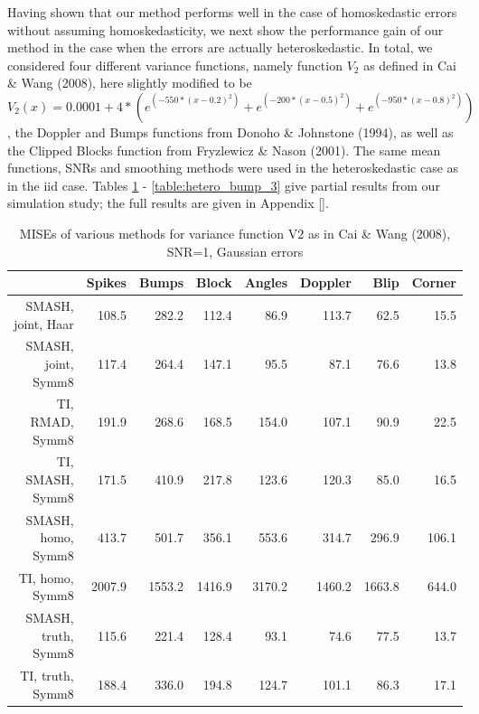 \documentclass[12pt]{article}
\begin{document}
Having shown that our method performs well in the case of homoskedastic errors without assuming homoskedasticity, we next show the performance gain of our method in the case when the errors are actually heteroskedastic. In total, we considered four different variance functions, namely function $V_2$ as defined in Cai \& Wang (2008), here slightly modified to be
\[V_2(x)=0.0001+4*(e^{(-550*(x-0.2)^2)}+e^{(-200*(x-0.5)^2)}+e^{(-950*(x-0.8)^2)})\]
, the Doppler and Bumps functions from Donoho \& Johnstone (1994), as well as the Clipped Blocks function from Fryzlewicz \& Nason (2001). The same mean functions, SNRs and smoothing methods were used in the heteroskedastic case as in the iid case. Tables \ref{table:hetero_v2_1} - \ref{table:hetero_bump_3} give partial results from our simulation study; the full results are given in Appendix \ref{}.\\
\begin{table}[ht]
\centering
\begin{tabular}{rrrrrrrr}
  \hline
 & Spikes & Bumps & Block & Angles & Doppler & Blip & Corner \\
  \hline
SMASH, joint, Haar & 108.5 & 282.2 & 112.4 & 86.9 & 113.7 & 62.5 & 15.5 \\
  SMASH, joint, Symm8 & 117.4 & 264.4 & 147.1 & 95.5 & 87.1 & 76.6 & 13.8 \\
  TI, RMAD, Symm8 & 191.9 & 268.6 & 168.5 & 154.0 & 107.1 & 90.9 & 22.5 \\
  TI, SMASH, Symm8 & 171.5 & 410.9 & 217.8 & 123.6 & 120.3 & 85.0 & 16.5 \\
  SMASH, homo, Symm8 & 413.7 & 501.7 & 356.1 & 553.6 & 314.7 & 296.9 & 106.1 \\
  TI, homo, Symm8 & 2007.9 & 1553.2 & 1416.9 & 3170.2 & 1460.2 & 1663.8 & 644.0 \\
  SMASH, truth, Symm8 & 115.6 & 221.4 & 128.4 & 93.1 & 74.6 & 77.5 & 13.7 \\
  TI, truth, Symm8 & 188.4 & 336.0 & 194.8 & 124.7 & 101.1 & 86.3 & 17.1 \\
   \hline
\end{tabular}
\caption{MISEs of various methods for variance function V2 as in Cai \& Wang (2008), SNR=1, Gaussian errors}
\label{table:hetero_v2_1}
\end{table}
\end{document}
